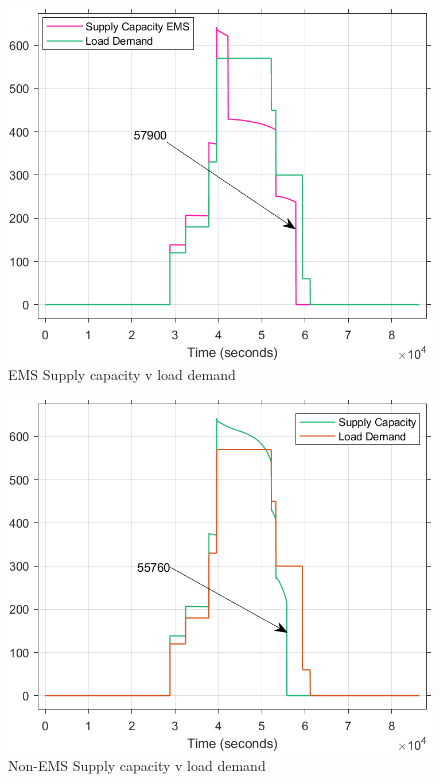 \begin{figure}[H]
	\centering
	\includegraphics[totalheight=8cm]{Figures/EMS Supply capacity v load demand3.png}
	\caption{EMS Supply capacity v load demand}
\end{figure}
\begin{figure}[H]
	\centering
	\includegraphics[totalheight=8cm]{Figures/non-ems supply capacity v load demand4.png}
	\caption{Non-EMS Supply capacity v load demand}
\end{figure}
